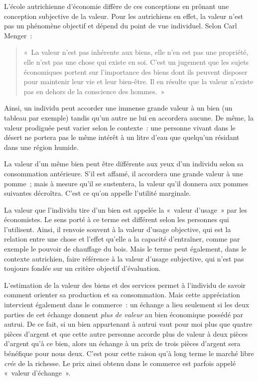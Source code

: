 L'école autrichienne d'économie diffère de ces conceptions en prônant une conception subjective de la valeur. Pour les autrichiens en effet, la valeur n'est pas un phénomène objectif et dépend du point de vue individuel. Selon Carl Menger~: 

\begin{quote}
«~La valeur n'est pas inhérente aux biens, elle n'en est pas une propriété, elle n'est pas une chose qui existe en soi. C'est un jugement que les sujets économiques portent sur l'importance des biens dont ils peuvent disposer pour maintenir leur vie et leur bien-être. Il en résulte que la valeur n'existe pas en dehors de la conscience des hommes.~»
\end{quote}

Ainsi, un individu peut accorder une immense grande valeur à un bien (un tableau par exemple) tandis qu'un autre ne lui en accordera aucune. De même, la valeur prodiguée peut varier selon le contexte~: une personne vivant dans le désert ne portera pas le même intérêt à un litre d'eau que quelqu'un résidant dans une région humide.

La valeur d'un même bien peut être différente aux yeux d'un individu selon sa consommation antérieure. S'il est affamé, il accordera une grande valeur à une pomme~; mais à mesure qu'il se sustentera, la valeur qu'il donnera aux pommes suivantes décroîtra. C'est ce qu'on appelle l'utilité marginale.

La valeur que l'individu tire d'un bien est appelée la «~valeur d'usage~» par les économistes. Le sens porté à ce terme est différent selon les personnes qui l'utilisent. Ainsi, il renvoie souvent à la valeur d'usage objective, qui est la relation entre une chose et l'effet qu'elle a la capacité d'entraîner, comme par exemple le pouvoir de chauffage du bois. Mais le terme peut également, dans le contexte autrichien, faire référence à la valeur d'usage subjective, qui n'est pas toujours fondée sur un critère objectif d'évaluation.

L'estimation de la valeur des biens et des services permet à l'individu de savoir comment orienter sa production et sa consommation. Mais cette appréciation intervient également dans le commerce~: un échange a lieu seulement si les deux parties de cet échange donnent \emph{plus de valeur} au bien économique possédé par autrui. De ce fait, si un bien appartenant à autrui vaut pour moi plus que quatre pièces d'argent et que cette autre personne accorde plus de valeur à deux pièces d'argent qu'à ce bien, alors un échange à un prix de trois pièces d'argent sera bénéfique pour nous deux. C'est pour cette raison qu'à long terme le marché libre \emph{crée} de la richesse. Le prix ainsi obtenu dans le commerce est parfois appelé «~valeur d'échange~».

